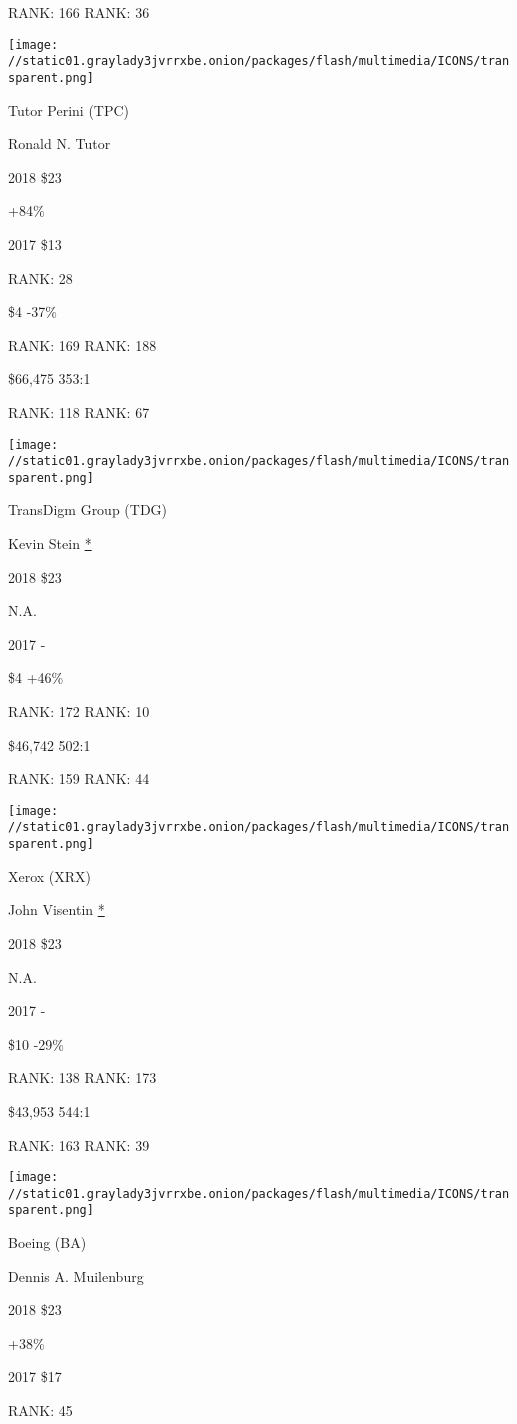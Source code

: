 RANK: 166 RANK: 36

\texttt{[image: //static01.graylady3jvrrxbe.onion/packages/flash/multimedia/ICONS/transparent.png]}

Tutor Perini (TPC)

Ronald N. Tutor \protect\hyperlink{g-footnotes}{}

2018 \$23

 +84\%

2017 \$13

RANK: 28

 \$4 -37\%

RANK: 169 RANK: 188

 \$66,475 353:1

RANK: 118 RANK: 67

\texttt{[image: //static01.graylady3jvrrxbe.onion/packages/flash/multimedia/ICONS/transparent.png]}

TransDigm Group (TDG)

Kevin Stein \protect\hyperlink{g-footnotes}{*}

2018 \$23

 N.A.

2017 -

 \$4 +46\%

RANK: 172 RANK: 10

 \$46,742 502:1

RANK: 159 RANK: 44

\texttt{[image: //static01.graylady3jvrrxbe.onion/packages/flash/multimedia/ICONS/transparent.png]}

Xerox (XRX)

John Visentin \protect\hyperlink{g-footnotes}{*}

2018 \$23

 N.A.

2017 -

 \$10 -29\%

RANK: 138 RANK: 173

 \$43,953 544:1

RANK: 163 RANK: 39

\texttt{[image: //static01.graylady3jvrrxbe.onion/packages/flash/multimedia/ICONS/transparent.png]}

Boeing (BA)

Dennis A. Muilenburg \protect\hyperlink{g-footnotes}{}

2018 \$23

 +38\%

2017 \$17

RANK: 45

